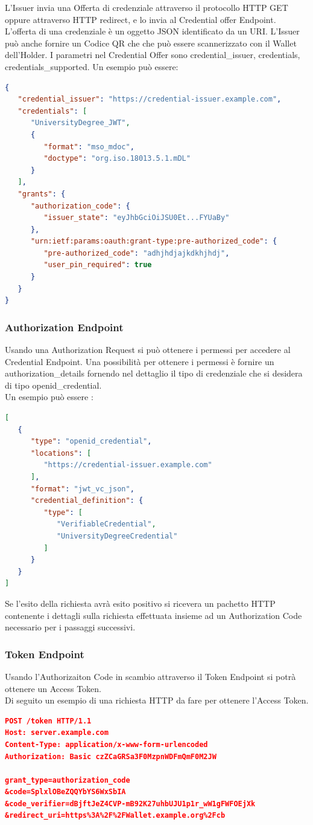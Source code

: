 L'Issuer invia una Offerta di credenziale attraverso il protocollo HTTP GET oppure attraverso HTTP redirect, e lo invia al Credential offer Endpoint.
L'offerta di una credenziale è un oggetto JSON identificato da un URI.
L'Issuer può anche fornire un Codice QR che che può essere scannerizzato con il Wallet dell'Holder.
I parametri nel Credential Offer sono credential\_issuer, credentials, credentials\_supported.
Un esempio può essere:
\begin{lstlisting}[language=json,firstnumber=1]
{
   "credential_issuer": "https://credential-issuer.example.com",
   "credentials": [
      "UniversityDegree_JWT",
      {
         "format": "mso_mdoc",
         "doctype": "org.iso.18013.5.1.mDL"
      }
   ],
   "grants": {
      "authorization_code": {
         "issuer_state": "eyJhbGciOiJSU0Et...FYUaBy"
      },
      "urn:ietf:params:oauth:grant-type:pre-authorized_code": {
         "pre-authorized_code": "adhjhdjajkdkhjhdj",
         "user_pin_required": true
      }
   }
}
\end{lstlisting}

\subsubsection{Authorization Endpoint}
Usando una Authorization Request si può ottenere i permessi per accedere al Credential Endpoint.
Una possibilità per ottenere i permessi è fornire un authorization\_details fornendo nel dettaglio il tipo di credenziale che si desidera
di tipo openid\_credential.\\
Un esempio può essere :
\begin{lstlisting}[language=json,firstnumber=1]
[
   {
      "type": "openid_credential",
      "locations": [
         "https://credential-issuer.example.com"
      ],
      "format": "jwt_vc_json",
      "credential_definition": {
         "type": [
            "VerifiableCredential",
            "UniversityDegreeCredential"
         ]
      }
   }
]
\end{lstlisting}
Se l'esito della richiesta avrà esito positivo si ricevera un pachetto HTTP contenente i dettagli sulla 
richiesta effettuata insieme ad un Authorization Code necessario per i passaggi successivi.
\subsubsection{Token Endpoint}
Usando l'Authorizaiton Code in scambio attraverso il Token Endpoint si potrà ottenere un Access Token.\\
Di seguito un esempio di una richiesta HTTP da fare per ottenere l'Access Token.
\begin{lstlisting}[language=json,firstnumber=1]
POST /token HTTP/1.1
Host: server.example.com
Content-Type: application/x-www-form-urlencoded
Authorization: Basic czZCaGRSa3F0MzpnWDFmQmF0M2JW

grant_type=authorization_code
&code=SplxlOBeZQQYbYS6WxSbIA
&code_verifier=dBjftJeZ4CVP-mB92K27uhbUJU1p1r_wW1gFWFOEjXk
&redirect_uri=https%3A%2F%2FWallet.example.org%2Fcb
\end{lstlisting}

